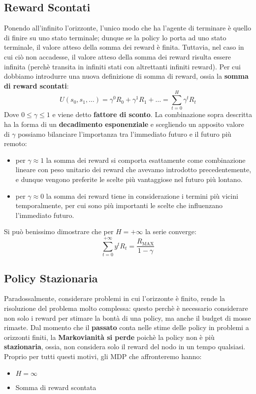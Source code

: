 \subsection{Reward Scontati}
Ponendo all'infinito l'orizzonte, l'unico modo che ha l'agente di terminare è quello di finire su uno stato terminale; dunque
se la policy lo porta ad uno stato terminale, il valore atteso della somma dei reward è finita. Tuttavia, nel caso in cui ciò
non accadesse, il valore atteso della somma dei reward risulta essere infinita (perchè transita in infiniti stati con altrettanti infiniti reward).
Per cui dobbiamo introdurre una nuova definizione di somma di reward, ossia la \textbf{somma di reward scontati}:
\begin{equation}
    U(s_0,s_1,\dots) = \gamma^0R_0 + \gamma^1R_1 + \dots = \sum_{t = 0}^{H}\gamma^tR_t
\end{equation}
Dove $0\leq\gamma\leq 1$ e viene detto \textbf{fattore di sconto}. La combinazione sopra descritta ha la forma di un 
\textbf{decadimento esponenziale} e scegliendo un apposito valore di $\gamma$ possiamo bilanciare l'importanza tra l'immediato
futuro e il futuro più remoto:
\begin{itemize}
    \item per $\gamma \approx 1$ la somma dei reward si comporta esattamente come combinazione lineare con peso unitario dei reward che avevamo introdotto precedentemente, e dunque vengono preferite le scelte più vantaggiose nel futuro più lontano.
    \item per $\gamma \approx 0$ la somma dei reward tiene in considerazione i termini più vicini temporalmente, per cui sono più importanti le scelte che influenzano l'immediato futuro.
\end{itemize}
Si può benissimo dimostrare che per $H = +\infty$ la serie converge:
\begin{equation}
    \sum_{t = 0}^{+\infty} y^tR_t = \frac{R_\text{MAX}}{1 - \gamma}
\end{equation}

\subsection{Policy Stazionaria}
Paradossalmente, considerare problemi in cui l'orizzonte è finito, rende la risoluzione del problema molto complessa:
questo perchè è necessario considerare non solo i reward per stimare la bontà di una policy, ma anche il budget di mosse rimaste.
Dal momento che il \textbf{passato} conta nelle stime delle policy in problemi a orizzonti finiti, la \textbf{Markovianità si perde} poichè
la policy non è più \textbf{stazionaria}, ossia, non considera solo il reward del nodo in un tempo qualsiasi. Proprio per tutti questi motivi, gli MDP che affronteremo hanno:
\begin{itemize}
    \item $H = \infty$
    \item Somma di reward scontata
\end{itemize}


